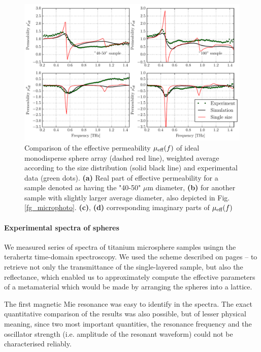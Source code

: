  \begin{figure}[ht]   %
	 \caption{Comparison of the effective permeability $\mu_{\text{eff} }(f)$ of ideal monodisperse sphere array (dashed red line), weighted average according to the size distribution (solid black line) and experimental data (green dots). \textbf{(a)} Real part of effective permeability for a sample denoted as having the "40-50" $\mu$m diameter, \textbf{(b)} for another sample with slightly larger average diameter, also depicted in Fig. \ref{fg_microphoto}. \textbf{(c)}, \textbf{(d)} corresponding imaginary parts of $\mu_{\text{eff} }(f)$}
\label{fg_mm2012_convolution} \centering 
\includegraphics[width=\textwidth]{img-expe/sphere_convolution/mm2012_convolution.pdf}
\end{figure}
\paragraph{Experimental spectra of spheres} %
We measured series of spectra of titanium microsphere samples usingn the terahertz time-domain spectroscopy. We used the scheme described on pages \pageref{srtm}--\pageref{srtm2} to retrieve not only the transmittance of the single-layered sample, but also the reflectance, which enabled us to approximately compute the effective parameters of a metamaterial which would be made by arranging the spheres into a lattice. 

The first magnetic Mie resonance was easy to identify in the spectra. The exact quantitative comparison of the results was also possible, but of lesser physical meaning, since two most important quantities, the resonance frequency and the oscillator strength (i.e. amplitude of the resonant waveform) could not be characterised reliably. 

